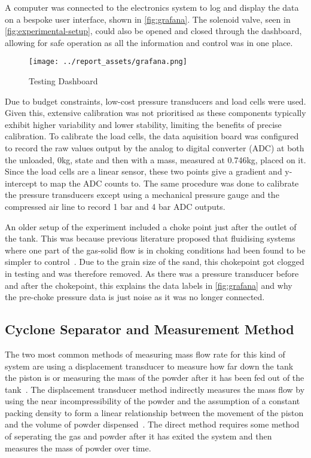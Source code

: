 A computer was connected to the electronics system to log and display the data on a bespoke user interface, shown in \autoref{fig:grafana}. The solenoid valve, seen in \autoref{fig:experimental-setup}, could also be opened and closed through the dashboard, allowing for safe operation as all the information and control was in one place.
\begin{figure}[htbp]
    \centering

    \begin{minipage}{0.95\textwidth}
        \centering
        \texttt{[image: ../report\_assets/grafana.png]}
        \caption{Testing Dashboard}\label{fig:grafana}
    \end{minipage}

\end{figure}
Due to budget constraints, low-cost pressure transducers and load cells were used. Given this, extensive calibration was not prioritised as these components typically exhibit higher variability and lower stability, limiting the benefits of precise calibration. To calibrate the load cells, the data aquisition board was configured to record the raw values output by the analog to digital converter (ADC) at both the unloaded, 0kg, state and then with a mass, measured at 0.746kg, placed on it. Since the load cells are a linear sensor, these two points give a gradient and y-intercept to map the ADC counts to. The same procedure was done to calibrate the pressure transducers except using a mechanical pressure gauge and the compressed air line to record 1 bar and 4 bar ADC outputs.

An older setup of the experiment included a choke point just after the outlet of the tank. This was because previous literature proposed that fluidising systems where one part of the gas-solid flow is in choking conditions had been found to be simpler to control~\cite{SUN201630}. Due to the grain size of the sand, this chokepoint got clogged in testing and was therefore removed. As there was a pressure transducer before and after the chokepoint, this explains the data labels in \autoref{fig:grafana} and why the pre-choke pressure data is just noise as it was no longer connected.

\subsection{Cyclone Separator and Measurement Method}
The two most common methods of measuring mass flow rate for this kind of system are using a displacement transducer to measure how far down the tank the piston is or measuring the mass of the powder after it has been fed out of the tank~\cite{SUN201630}\cite{LI2021712}\cite{Tang22}. The displacement transducer method indirectly measures the mass flow by using the near incompressibility of the powder and the assumption of a constant packing density to form a linear relationship between the movement of the piston and the volume of powder dispensed~\cite{SUN201630}. The direct method requires some method of seperating the gas and powder after it has exited the system and then measures the mass of powder over time. 

